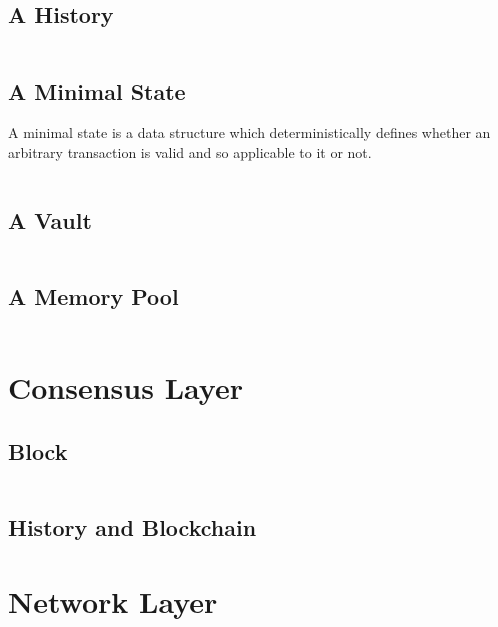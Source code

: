\documentclass[]{report}   %
\begin{document}
\subsection{A History}

\begin{lstlisting}
\end{lstlisting}

\subsection{A Minimal State}

A minimal state is a data structure which deterministically defines whether an arbitrary transaction is valid and so
applicable to it or not.

\begin{lstlisting}
\end{lstlisting}

\subsection{A Vault}

\begin{lstlisting}
\end{lstlisting}

\subsection{A Memory Pool}

\begin{lstlisting}
\end{lstlisting}


\section{Consensus Layer}

\subsection{Block}

\begin{lstlisting}

\end{lstlisting}

\subsection{History and Blockchain}

\section{Network Layer}
\end{document}
